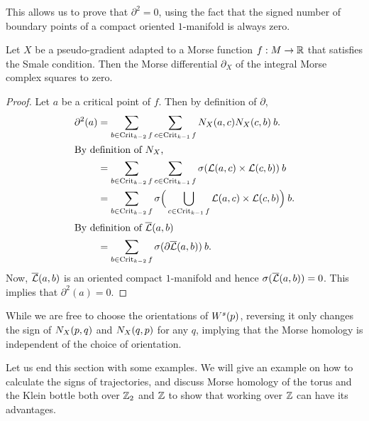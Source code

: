     This allows us to prove that $\partial^2 = 0$, using the fact that the signed number of boundary points of a compact oriented $1$-manifold is always zero.
    \begin{theorem}
        Let $X$ be a pseudo-gradient adapted to a Morse function  $f: M \to  \mathbb{R}$ that satisfies the Smale condition.
        Then the Morse differential $\partial_X$ of the integral Morse complex squares to zero.
    \end{theorem}
    \begin{proof}
        Let $a$ be a critical point of $f$.
        Then by definition of $\partial$,
        \begin{align*}
            \partial^2(a)
            &= 
            \sum_{b \in  \operatorname{Crit}_{k-2}f}
            \sum_{c \in  \operatorname{Crit}_{k-1}f}
            N_X(a, c) N_X(c, b) \: b.\\
            \shortintertext{By definition of $N_X$,}
            &= 
            \sum_{b \in  \operatorname{Crit}_{k-2}f}
            \sum_{c \in  \operatorname{Crit}_{k-1}f}
            \sigma(\mathcal L(a, c) \times \mathcal L(c, b) )\:  b\\
            &= 
            \sum_{b \in  \operatorname{Crit}_{k-2}f}
            \sigma\Big( \bigcup_{c \in  \operatorname{Crit}_{k-1}f}
            \mathcal L(a, c) \times \mathcal L(c, b) \Big)\:  b.\\
            \shortintertext{By definition of $\overline{\mathcal L}(a, b)$}
            &= \sum_{b \in  \operatorname{Crit}_{k-2}f} \sigma(\partial \overline{\mathcal L}(a, b))\:  b.
        \end{align*} 
        Now, $\overline{\mathcal L}(a, b)$ is an oriented compact  $1$-manifold and hence $\sigma(\overline{\mathcal L}(a, b)) = 0$.
        This implies that $\partial^2(a) = 0$.
    \end{proof}
    \begin{remark}
        While we are free to choose the orientations of $W^s(p)$, reversing it only changes the sign of $N_{X}(p, q)$ and  $N_{X}(q, p)$ for any $q$, implying that the Morse homology is independent of the choice of orientation.
    \end{remark}


    Let us end this section with some examples.
    We will give an example on how to calculate the signs of trajectories, and discuss Morse homology of the torus and the Klein bottle both over $ \mathbb{Z}_2$ and $\mathbb{Z}$ to show that working over $ \mathbb{Z}$ can have its advantages.

